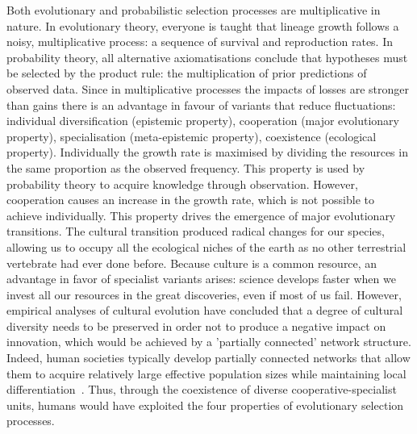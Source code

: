 Both evolutionary and probabilistic selection processes are multiplicative in nature.
In evolutionary theory, everyone is taught that lineage growth follows a noisy, multiplicative process: a sequence of survival and reproduction rates.
In probability theory, all alternative axiomatisations conclude that hypotheses must be selected by the product rule: the multiplication of prior predictions of observed data.
Since in multiplicative processes the impacts of losses are stronger than gains there is an advantage in favour of variants that reduce fluctuations: individual diversification (epistemic property), cooperation (major evolutionary property), specialisation (meta-epistemic property), coexistence (ecological property).
Individually the growth rate is maximised by dividing the resources in the same proportion as the observed frequency.
This property is used by probability theory to acquire knowledge through observation.
However, cooperation causes an increase in the growth rate, which is not possible to achieve individually.
This property drives the emergence of major evolutionary transitions.
The cultural transition produced radical changes for our species, allowing us to occupy all the ecological niches of the earth as no other terrestrial vertebrate had ever done before.
Because culture is a common resource, an advantage in favor of specialist variants arises: science develops faster when we invest all our resources in the great discoveries, even if most of us fail.
However, empirical analyses of cultural evolution have concluded that a degree of cultural diversity needs to be preserved in order not to produce a negative impact on innovation, which would be achieved by a 'partially connected' network structure.
Indeed, human societies typically develop partially connected networks that allow them to acquire relatively large effective population sizes while maintaining local differentiation~\cite{migliano2017-hunterGathererNetwork, padilla2022-interconnectivity}.
Thus, through the coexistence of diverse cooperative-specialist units, humans would have exploited the four properties of evolutionary selection processes.
